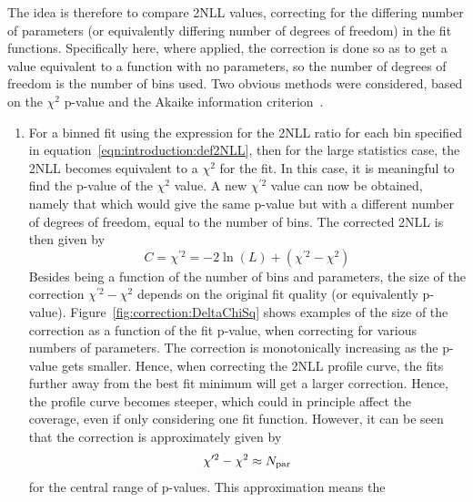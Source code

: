 The idea is therefore to compare 2NLL values,
correcting for the differing number of parameters 
(or equivalently differing number of degrees of freedom) in
the fit functions. Specifically here, where applied, the correction is
done so as to get a value equivalent to a function with no parameters, so
the number of degrees of freedom is the number of bins used.
Two obvious methods were considered, based on the 
$\chi^2$ p-value and the Akaike information 
criterion~\cite{ref:correction:akaike}.
\begin{enumerate}
\item %
For a binned fit using the expression for the 2NLL ratio
for each bin specified in equation~\ref{eqn:introduction:def2NLL}, then for
the large statistics case, the 2NLL becomes equivalent to a $\chi^2$ for the
fit. In this case, it is meaningful to find the p-value of the $\chi^2$ value.
A new $\chi^{\prime 2}$
value can now be obtained, namely that which would give the same p-value but
with a different number of degrees of freedom, equal to the number of bins.
The corrected 2NLL is then given by
\begin{displaymath}
C = \chi^{\prime 2} = - 2\ln(L) + (\chi^{\prime 2} - \chi^2)
\end{displaymath}
Besides being a function of the number of bins and parameters,
the size of the correction $\chi^{\prime 2} - \chi^2$
depends on the original fit quality
(or equivalently p-value). Figure~\ref{fig:correction:DeltaChiSq}
shows examples of the size of the correction as a function of the
fit p-value, when correcting for various numbers of parameters.
The correction is monotonically increasing as the p-value gets smaller.
Hence, when correcting the 2NLL profile curve, the fits further away from
the best fit minimum will get a larger correction. Hence, the profile curve
becomes steeper, which could in principle affect the coverage, even if
only considering one fit function.
However, it can be seen that the correction is approximately given by
\begin{displaymath}
\chi^{\prime 2} - \chi^2 \approx N_{\rm par}
\end{displaymath}
for the central range of p-values. This approximation means the 

\end{enumerate}
